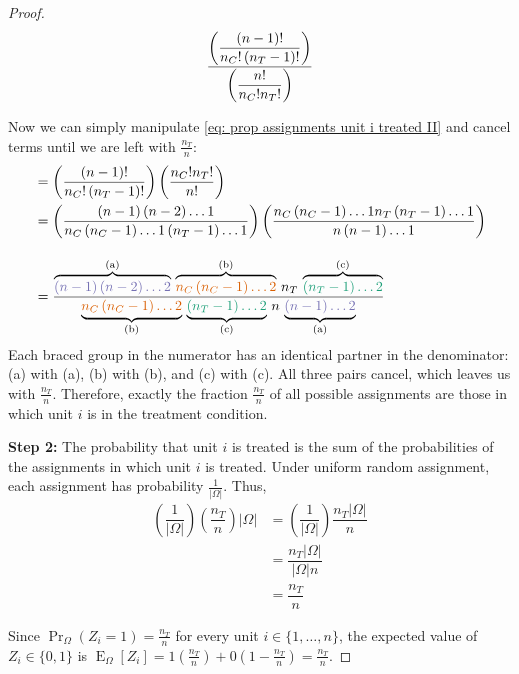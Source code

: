 \documentclass[12pt,leqno]{article}
\theoremstyle{newstyle}
\DeclareMathOperator{\E}{\mathrm{E}}
\DeclareMathOperator{\Var}{\mathrm{Var}}
\newcommand{\EZ}{\E_{\Omega}}    \newcommand{\VarZ}{\Var_{\Omega}}  %
\renewcommand{\Pr}{\operatorname{Pr}}
\begin{document}
\begin{proof}
\begin{equation}\label{eq: prop assignments unit i treated II}
\dfrac{\left(\dfrac{\left(n - 1\right)!}{n_C!\left(n_T - 1\right)!}\right)}{\left(\dfrac{n!}{n_C!n_T!}\right)} \\
\end{equation}

Now we can simply manipulate \eqref{eq: prop assignments unit i treated II} and cancel terms until we are left with $\frac{n_T}{n}$:
\begin{align*}
& = \left(\dfrac{\left(n - 1\right)!}{n_C!\left(n_T - 1\right)!}\right)\left(\dfrac{n_C!n_T!}{n!}\right) \\
& = \left(\dfrac{\left(n - 1\right)\left(n - 2\right) \dots 1}{n_C\left(n_C - 1\right) \dots 1 \left(n_T - 1\right) \dots 1}\right) \left(\dfrac{n_C\left(n_C - 1\right) \dots 1 n_T \left(n_T - 1\right) \dots 1}{n\left(n - 1\right) \dots 1}\right) \\[2.5ex]
& = \dfrac{\overbrace{\textcolor{eqblue}{\left(n - 1\right)\left(n - 2\right) \dots 2}}^{\text{(a)}} \, \overbrace{\textcolor{eqred}{n_C\left(n_C - 1\right) \dots 2}}^{\text{(b)}} \, n_T \, \overbrace{\textcolor{eqgreen}{\left(n_T - 1\right) \dots 2}}^{\text{(c)}}}{\underbrace{\textcolor{eqred}{n_C\left(n_C - 1\right) \dots 2}}_{\text{(b)}} \, \underbrace{\textcolor{eqgreen}{\left(n_T - 1\right) \dots 2}}_{\text{(c)}} \, n \, \underbrace{\textcolor{eqblue}{\left(n - 1\right) \dots 2}}_{\text{(a)}}} \\
\end{align*}
Each braced group in the numerator has an identical partner in the denominator: (a) with (a), (b) with (b), and (c) with (c). All three pairs cancel, which leaves us with $\frac{n_T}{n}$. Therefore, exactly the fraction $\frac{n_T}{n}$ of all possible assignments are those in which unit $i$ is in the treatment condition.

\textbf{Step 2:} The probability that unit $i$ is treated is the sum of the probabilities of the assignments in which unit $i$ is treated. Under uniform random assignment, each assignment has probability $\frac{1}{\lvert\Omega\rvert}$. Thus,
\begin{align*}
\left(\dfrac{1}{\left\lvert\Omega\right\rvert}\right) \left(\dfrac{n_T}{n}\right)\left\lvert\Omega\right\rvert & = \left(\dfrac{1}{\left\lvert\Omega\right\rvert}\right) \dfrac{n_T\left\lvert\Omega\right\rvert}{n} \\[1ex]
& = \dfrac{n_T\left\lvert\Omega\right\rvert}{\left\lvert\Omega\right\rvert n} \\[1ex]
& = \dfrac{n_T}{n}  
 \end{align*}

Since $\Pr_{\Omega}(Z_i = 1) = \frac{n_T}{n}$ for every unit $i \in \{1, \dots , n\}$, the expected value of $Z_i \in \{0, 1\}$ is $\EZ[Z_i] = 1(\frac{n_T}{n}) + 0(1 - \frac{n_T}{n}) = \frac{n_T}{n}$.
\end{proof}
\end{document}
